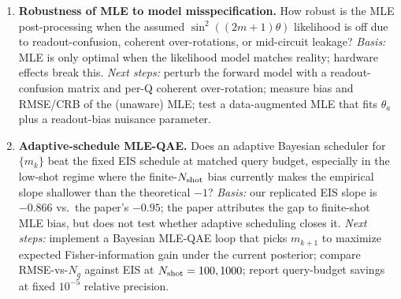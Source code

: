 \begin{enumerate}
    \item \textbf{Robustness of MLE to model misspecification.} How robust is
    the MLE post-processing when the assumed $\sin^2((2m+1)\theta)$ likelihood
    is off due to readout-confusion, coherent over-rotations, or mid-circuit
    leakage?
    \emph{Basis:} MLE is only optimal when the likelihood model matches
    reality; hardware effects break this.
    \emph{Next steps:} perturb the forward model with a readout-confusion
    matrix and per-Q coherent over-rotation; measure bias and RMSE/CRB of the
    (unaware) MLE; test a data-augmented MLE that fits $\theta_a$ plus a
    readout-bias nuisance parameter.

    \item \textbf{Adaptive-schedule MLE-QAE.} Does an adaptive Bayesian
    scheduler for $\{m_k\}$ beat the fixed EIS schedule at matched query
    budget, especially in the low-shot regime where the finite-$N_{\rm shot}$
    bias currently makes the empirical slope shallower than the theoretical
    $-1$?
    \emph{Basis:} our replicated EIS slope is $-0.866$ vs.\ the paper's
    $-0.95$; the paper attributes the gap to finite-shot MLE bias, but does
    not test whether adaptive scheduling closes it.
    \emph{Next steps:} implement a Bayesian MLE-QAE loop that picks
    $m_{k+1}$ to maximize expected Fisher-information gain under the current
    posterior; compare RMSE-vs-$N_q$ against EIS at $N_{\rm shot}=100,1000$;
    report query-budget savings at fixed $10^{-5}$ relative precision.
\end{enumerate}
